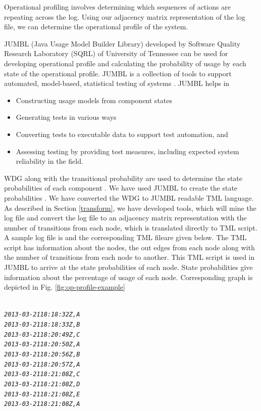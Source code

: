 \begin{enumerate}
\begin{enumerate}
Operational profiling involves determining which sequences of actions are repeating across the log. Using our adjacency matrix representation of the log file, we can determine the operational profile of the system. 

JUMBL (Java Usage Model Builder Library) developed by Software Quality Research Laboratory (SQRL) of University of Tennessee \cite{jumbl} can be used for developing operational profile and calculating the probability of usage by each state of the operational profile. JUMBL is a collection of tools to support automated, model-based, statistical testing of systems \cite{jug}. JUMBL helps in

\begin{itemize}
\item Constructing usage models from component states
\item Generating tests in various ways
\item Converting tests to executable data to support test automation, and
\item Assessing testing by providing test measures, including expected system reliability in the field.
\end{itemize}

WDG along with the transitional probability are used to determine the state probabilities of each component . We have used JUMBL to create the state probabilities \cite{anil}. We have converted the WDG to JUMBL readable TML \cite{tug} language. As described in Section \ref{transform}, we have developed tools, which will mine the log file and convert the log file to an adjacency matrix representation with the number of transitions from each node, which is translated directly to TML script. A sample log file is and the corresponding TML fileare given below. The TML script has information about the nodes, the out edges from each node along with the number of transitions from each node to another. This TML script is used in JUMBL to arrive at the state probabilities of each node. State probabilities give information about the percentage of usage of each node. Corresponding graph is depicted in Fig. \ref{fig:op-profile-example}



\begin{alltt}
\small{ \emph{
2013-03-21 18:18:32Z,A
2013-03-21 18:18:33Z,B
2013-03-21 18:20:49Z,C
2013-03-21 18:20:50Z,A
2013-03-21 18:20:56Z,B
2013-03-21 18:20:57Z,A
2013-03-21 18:21:08Z,C
2013-03-21 18:21:08Z,D
2013-03-21 18:21:08Z,E
2013-03-21 18:21:08Z,A
}}
\end{alltt}


\end{enumerate}
\end{enumerate}
